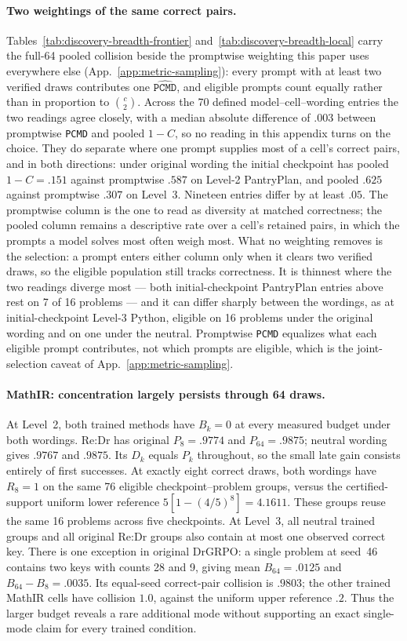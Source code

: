 \documentclass{article}
\newcommand{\1}{\mathbf 1}
\newcommand{\pmd}{\texttt{PCMD}}
\theoremstyle{remark}
\theoremstyle{definition}
\theoremstyle{plain}
\begin{document}
\paragraph{Two weightings of the same correct pairs.}
Tables~\ref{tab:discovery-breadth-frontier} and~\ref{tab:discovery-breadth-local}
carry the full-64 pooled collision beside the promptwise weighting this paper
uses everywhere else (App.~\ref{app:metric-sampling}): every prompt with at
least two verified draws contributes one $\widehat{\pmd}$, and eligible
prompts count equally rather than in proportion to $\binom{c}{2}$. Across the
70 defined model--cell--wording entries the two readings agree closely, with a
median absolute difference of $.003$ between promptwise \pmd{} and pooled
$1-C$, so no reading in this appendix turns on the choice. They do separate
where one prompt supplies most of a cell's correct pairs, and in both
directions: under original wording the initial checkpoint has pooled
$1-C=.151$ against promptwise $.587$ on Level-2 PantryPlan, and pooled $.625$
against promptwise $.307$ on Level~3. Nineteen entries differ by at least
$.05$. The promptwise column is the one to read as diversity at matched
correctness; the pooled column remains a descriptive rate over a cell's
retained pairs, in which the prompts a model solves most often weigh most.
What no weighting removes is the selection: a prompt enters either column
only when it clears two verified draws, so the eligible population still
tracks correctness. It is thinnest where the two readings diverge most ---
both initial-checkpoint PantryPlan entries above rest on 7 of 16 problems
--- and it can differ sharply between the wordings, as at initial-checkpoint
Level-3 Python, eligible on 16 problems under the original wording and on
one under the neutral. Promptwise \pmd{} equalizes what each eligible prompt
contributes, not which prompts are eligible, which is the joint-selection
caveat of App.~\ref{app:metric-sampling}.

\paragraph{MathIR: concentration largely persists through 64 draws.}
At Level~2, both trained methods have $B_k=0$ at every measured budget under
both wordings. Re:Dr has original $P_8=.9774$ and $P_{64}=.9875$;
neutral wording gives $.9767$ and $.9875$. Its $D_k$ equals $P_k$ throughout,
so the small late gain consists entirely of first successes. At exactly eight
correct draws, both wordings have $R_8=1$ on the same 76 eligible
checkpoint--problem groups, versus the certified-support uniform lower
reference $5[1-(4/5)^8]=4.1611$. These groups reuse the same 16 problems
across five checkpoints. At Level~3, all neutral trained groups and all
original Re:Dr groups also contain at most one observed correct key.
There is one exception in original DrGRPO: a single problem at seed~46
contains two keys with counts 28 and 9, giving mean $B_{64}=.0125$ and
$B_{64}-B_8=.0035$. Its equal-seed correct-pair collision is $.9803$;
the other trained MathIR cells have collision $1.0$, against the uniform
upper reference $.2$. Thus the larger budget reveals a rare additional mode
without supporting an exact single-mode claim for every trained condition.
\end{document}
